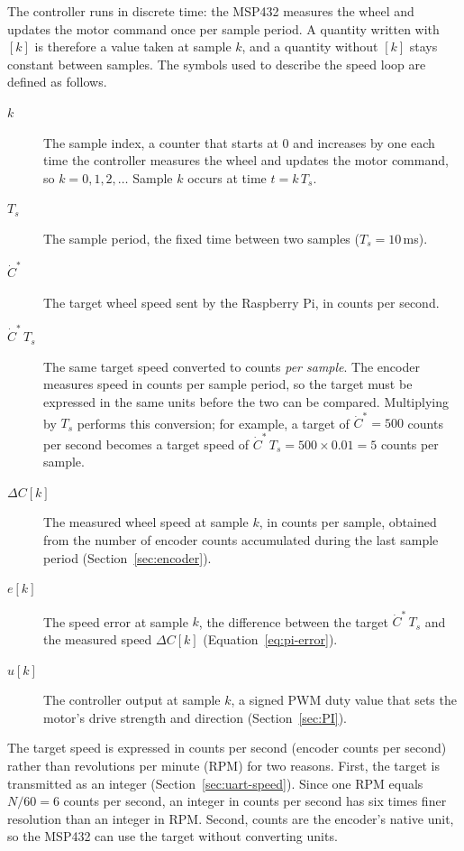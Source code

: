 The controller runs in discrete time: the MSP432 measures the wheel and updates the motor
command once per sample period. A quantity written with $[k]$ is
therefore a value taken at sample $k$, and a quantity without $[k]$ stays constant
between samples. The symbols used to describe the speed loop are defined as follows.
\begin{description}
  \item[$k$] The sample index, a counter that starts at $0$ and increases by one each
    time the controller measures the wheel and updates the motor command, so
    $k = 0, 1, 2, \dots$ Sample $k$ occurs at time $t = k\,T_s$.
  \item[$T_s$] The sample period, the fixed time between two samples
    ($T_s = 10$\,ms).
  \item[$\dot{C}^*$] The target wheel speed sent by the Raspberry Pi, in counts per second.
  \item[$\dot{C}^*\,T_s$] The same target speed converted to counts \emph{per sample}. The encoder
    measures speed in counts per sample period, so the target must be expressed in the
    same units before the two can be compared. Multiplying by $T_s$ performs this
    conversion; for example, a target of $\dot{C}^* = 500$ counts per second becomes
    a target speed of $\dot{C}^*\,T_s = 500 \times 0.01 = 5$ counts per sample.
  \item[{$\Delta C[k]$}] The measured wheel speed at sample $k$, in counts per sample,
    obtained from the number of encoder counts accumulated during the last sample period
    (Section~\ref{sec:encoder}).
  \item[{$e[k]$}] The speed error at sample $k$, the difference between the target
    $\dot{C}^*\,T_s$ and the measured speed $\Delta C[k]$ (Equation~\ref{eq:pi-error}).
  \item[{$u[k]$}] The controller output at sample $k$, a signed PWM duty value that sets
    the motor's drive strength and direction (Section~\ref{sec:PI}).
\end{description}

The target speed is expressed in counts per second (encoder counts per second) rather than revolutions per minute
(RPM) for two reasons. First, the target is transmitted as an integer
(Section~\ref{sec:uart-speed}). Since one RPM equals $N/60 = 6$ counts per second, an
integer in counts per second has six times finer resolution than an integer in RPM.
Second, counts are the encoder's native unit, so the MSP432 can use the target without
converting units.

